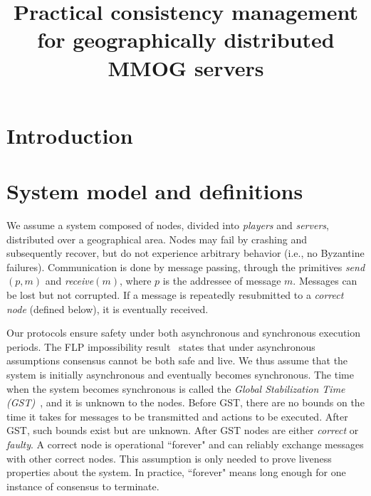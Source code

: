 \documentclass[times, 10pt]{article}
\begin{document}
\newcommand{\mv}[1]{\ensuremath{\operatorname{\mathit{#1}}}}
\newcommand{\bc}[1]{\textcolor{dark}{#1}}
\newtheorem{lems}{Lemma}
\newtheorem{props}{Proposition}
\newtheorem{thms}{Theorem}
\newtheorem{defs}{Definition}
\newtheorem{obs}{Observation}

\newcommand{\code}[1]{\texttt{\small{\textbf{#1}}}}

\title{Practical consistency management for geographically distributed MMOG servers}


\maketitle

\begin{abstract}


\end{abstract}

\section{Introduction}
\label{sec:intro}


\section{System model and definitions}
\label{sec:model}

We assume a system composed of nodes, divided into \emph{players} and \emph{servers}, distributed over a geographical area. Nodes may fail by crashing and subsequently recover, but do not experience arbitrary behavior (i.e., no Byzantine failures). Communication is done by message passing, through the primitives \emph{send}$(p,m)$ and \emph{receive}$(m)$, where $p$ is the addressee of message $m$. Messages can be lost but not corrupted. If a message is repeatedly resubmitted to a \emph{correct node} (defined below), it is eventually received.

Our protocols ensure safety under both asynchronous and synchronous execution periods. The FLP impossibility result~\cite{FLP85} states that under asynchronous assumptions consensus cannot be both safe and live. We thus assume that the system is initially asynchronous and eventually becomes synchronous. The time when the system becomes synchronous is called the \emph{Global Stabilization Time (GST)}~\cite{DLS88}, and it is unknown to the nodes.
Before GST, there are no bounds on the time it takes for messages to be transmitted and actions to be executed. After GST, such bounds exist but are unknown. After GST nodes are either \emph{correct} or \emph{faulty}. A correct node is operational ``forever" and can reliably exchange messages with other correct nodes. This assumption is only needed to prove liveness properties about the system. In practice, ``forever" means long enough for one instance of consensus to terminate.
\end{document}
